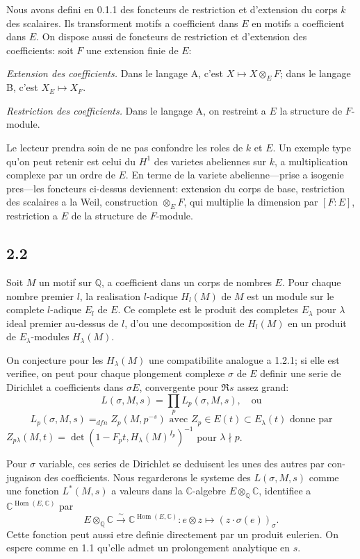 \documentclass[12pt,a4paper]{article}
\theoremstyle{plain}
\theoremstyle{definition}
\theoremstyle{remark}
\DeclareMathOperator{\Hom}{Hom}
\newcommand{\Q}{\mathbb{Q}}
\newcommand{\C}{\mathbb{C}}
\begin{document}
Nous avons defini en 0.1.1 des foncteurs de restriction et d'extension du corps $k$
des scalaires. Ils transforment motifs a coefficient dans $E$ en motifs a coefficient dans
$E$. On dispose aussi de foncteurs de restriction et d'extension des coefficients: soit
$F$ une extension finie de $E$:

\textit{Extension des coefficients.} Dans le langage A, c'est $X \mapsto X \otimes_E F$; dans le
langage B, c'est $X_E \mapsto X_F$.

\textit{Restriction des coefficients.} Dans le langage A, on restreint a $E$ la structure de
$F$-module.

Le lecteur prendra soin de ne pas confondre les roles de $k$ et $E$. Un exemple type
qu'on peut retenir est celui du $H^1$ des varietes abeliennes sur $k$, a multiplication
complexe par un ordre de $E$. En terme de la variete abelienne---prise a isogenie
pres---les foncteurs ci-dessus deviennent: extension du corps de base, restriction
des scalaires a la Weil, construction $\otimes_E F$, qui multiplie la dimension par $[F:E]$,
restriction a $E$ de la structure de $F$-module.

\subsection*{2.2}

Soit $M$ un motif sur $\Q$, a coefficient dans un corps de nombres $E$. Pour chaque
nombre premier $l$, la realisation $l$-adique $H_l(M)$ de $M$ est un module sur le complete
$l$-adique $E_l$ de $E$. Ce complete est le produit des completes $E_\lambda$ pour $\lambda$
ideal premier au-dessus de $l$, d'ou une decomposition de $H_l(M)$ en un produit de
$E_\lambda$-modules $H_\lambda(M)$.

On conjecture pour les $H_\lambda(M)$ une compatibilite analogue a 1.2.1; si elle est
verifiee, on peut pour chaque plongement complexe $\sigma$ de $E$ definir une serie de
Dirichlet a coefficients dans $\sigma E$, convergente pour $\Re s$ assez grand:
\[
L(\sigma, M, s) = \prod_p L_p(\sigma, M, s), \quad \text{ou}
\]
\begin{equation}\label{eq:2.2.1}
L_p(\sigma, M, s) =_{dfn} Z_p(M, p^{-s}) \text{ avec } Z_p \in E(t) \subset E_\lambda(t)
\text{ donne par}
\end{equation}
$Z_{p\lambda}(M, t) = \det(1 - F_p t, H_\lambda(M)^{I_p})^{-1}$ pour $\lambda \nmid p$.

Pour $\sigma$ variable, ces series de Dirichlet se deduisent les unes des autres par con-
jugaison des coefficients. Nous regarderons le systeme des $L(\sigma, M, s)$ comme une
fonction $L^*(M, s)$ a valeurs dans la $\C$-algebre $E \otimes_\Q \C$, identifiee a $\C^{\Hom(E,\C)}$ par
\begin{equation}\label{eq:2.2.2}
E \otimes_\Q \C \xrightarrow{\sim} \C^{\Hom(E,\C)}: e \otimes z \mapsto (z \cdot \sigma(e))_\sigma.
\end{equation}
Cette fonction peut aussi etre definie directement par un produit eulerien. On espere
comme en 1.1 qu'elle admet un prolongement analytique en $s$.
\end{document}
